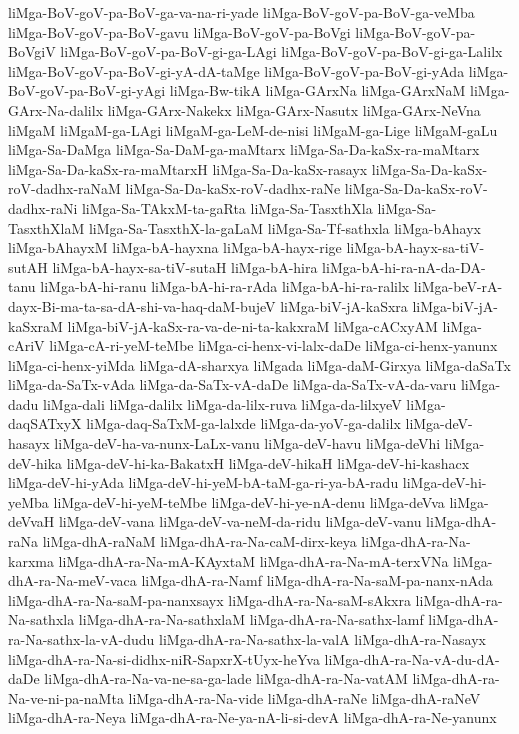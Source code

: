 {liMga-BoV-goV-pa-BoV-ga-va-na-ri-yade
liMga-BoV-goV-pa-BoV-ga-veMba
liMga-BoV-goV-pa-BoV-gavu
liMga-BoV-goV-pa-BoVgi
liMga-BoV-goV-pa-BoVgiV
liMga-BoV-goV-pa-BoV-gi-ga-LAgi
liMga-BoV-goV-pa-BoV-gi-ga-Lalilx
liMga-BoV-goV-pa-BoV-gi-yA-dA-taMge
liMga-BoV-goV-pa-BoV-gi-yAda
liMga-BoV-goV-pa-BoV-gi-yAgi
liMga-Bw-tikA
liMga-GArxNa
liMga-GArxNaM
liMga-GArx-Na-dalilx
liMga-GArx-Nakekx
liMga-GArx-Nasutx
liMga-GArx-NeVna
liMgaM
liMgaM-ga-LAgi
liMgaM-ga-LeM-de-nisi
liMgaM-ga-Lige
liMgaM-gaLu
liMga-Sa-DaMga
liMga-Sa-DaM-ga-maMtarx
liMga-Sa-Da-kaSx-ra-maMtarx
liMga-Sa-Da-kaSx-ra-maMtarxH
liMga-Sa-Da-kaSx-rasayx
liMga-Sa-Da-kaSx-roV-dadhx-raNaM
liMga-Sa-Da-kaSx-roV-dadhx-raNe
liMga-Sa-Da-kaSx-roV-dadhx-raNi
liMga-Sa-TAkxM-ta-gaRta
liMga-Sa-TasxthXla
liMga-Sa-TasxthXlaM
liMga-Sa-TasxthX-la-gaLaM
liMga-Sa-Tf-sathxla
liMga-bAhayx
liMga-bAhayxM
liMga-bA-hayxna
liMga-bA-hayx-rige
liMga-bA-hayx-sa-tiV-sutAH
liMga-bA-hayx-sa-tiV-sutaH
liMga-bA-hira
liMga-bA-hi-ra-nA-da-DA-tanu
liMga-bA-hi-ranu
liMga-bA-hi-ra-rAda
liMga-bA-hi-ra-ralilx
liMga-beV-rA-dayx-Bi-ma-ta-sa-dA-shi-va-haq-daM-bujeV
liMga-biV-jA-kaSxra
liMga-biV-jA-kaSxraM
liMga-biV-jA-kaSx-ra-va-de-ni-ta-kakxraM
liMga-cACxyAM
liMga-cAriV
liMga-cA-ri-yeM-teMbe
liMga-ci-henx-vi-lalx-daDe
liMga-ci-henx-yanunx
liMga-ci-henx-yiMda
liMga-dA-sharxya
liMgada
liMga-daM-Girxya
liMga-daSaTx
liMga-da-SaTx-vAda
liMga-da-SaTx-vA-daDe
liMga-da-SaTx-vA-da-varu
liMga-dadu
liMga-dali
liMga-dalilx
liMga-da-lilx-ruva
liMga-da-lilxyeV
liMga-daqSATxyX
liMga-daq-SaTxM-ga-lalxde
liMga-da-yoV-ga-dalilx
liMga-deV-hasayx
liMga-deV-ha-va-nunx-LaLx-vanu
liMga-deV-havu
liMga-deVhi
liMga-deV-hika
liMga-deV-hi-ka-BakatxH
liMga-deV-hikaH
liMga-deV-hi-kashacx
liMga-deV-hi-yAda
liMga-deV-hi-yeM-bA-taM-ga-ri-ya-bA-radu
liMga-deV-hi-yeMba
liMga-deV-hi-yeM-teMbe
liMga-deV-hi-ye-nA-denu
liMga-deVva
liMga-deVvaH
liMga-deV-vana
liMga-deV-va-neM-da-ridu
liMga-deV-vanu
liMga-dhA-raNa
liMga-dhA-raNaM
liMga-dhA-ra-Na-caM-dirx-keya
liMga-dhA-ra-Na-karxma
liMga-dhA-ra-Na-mA-KAyxtaM
liMga-dhA-ra-Na-mA-terxVNa
liMga-dhA-ra-Na-meV-vaca
liMga-dhA-ra-Namf
liMga-dhA-ra-Na-saM-pa-nanx-nAda
liMga-dhA-ra-Na-saM-pa-nanxsayx
liMga-dhA-ra-Na-saM-sAkxra
liMga-dhA-ra-Na-sathxla
liMga-dhA-ra-Na-sathxlaM
liMga-dhA-ra-Na-sathx-lamf
liMga-dhA-ra-Na-sathx-la-vA-dudu
liMga-dhA-ra-Na-sathx-la-valA
liMga-dhA-ra-Nasayx
liMga-dhA-ra-Na-si-didhx-niR-SapxrX-tUyx-heYva
liMga-dhA-ra-Na-vA-du-dA-daDe
liMga-dhA-ra-Na-va-ne-sa-ga-lade
liMga-dhA-ra-Na-vatAM
liMga-dhA-ra-Na-ve-ni-pa-naMta
liMga-dhA-ra-Na-vide
liMga-dhA-raNe
liMga-dhA-raNeV
liMga-dhA-ra-Neya
liMga-dhA-ra-Ne-ya-nA-li-si-devA
liMga-dhA-ra-Ne-yanunx
}
